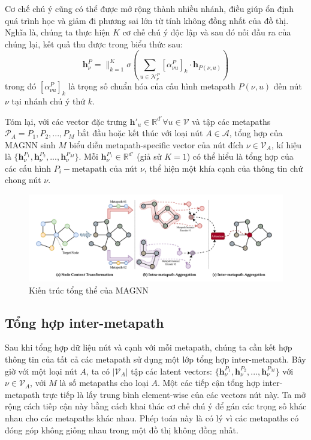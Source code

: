 Cơ chế chú ý cũng có thể được mở rộng thành nhiều nhánh, điều giúp ổn định quá trình học và giảm đi phương sai lớn từ tính không đồng nhất của đồ thị. Nghĩa là, chúng ta thực hiện $K$ cơ chế chú ý độc lập và sau đó nối đầu ra của chúng lại, kết quả thu được trong biểu thức sau:
\begin{equation}
  \mathbf{h}^P_{\nu} = \parallel ^K_{k=1} \sigma \left( \sum_{u \in \pmb{\mathcal{N}}^P_{\nu}} \left[ \alpha ^P_{\nu u} \right]_k \cdot \mathbf{h}_{P(\nu, u)} \right)
\end{equation} 
trong đó $\left[ \alpha ^P_{\nu u} \right]_k$ là trọng số chuẩn hóa của cấu hình metapath $P(\nu, u)$ đến nút $\nu$ tại nhánh chú ý thứ $k$.

Tóm lại, với các vector đặc trưng $\mathbf{h'}_{u} \in \mathbb{R}^{d'} \forall u \in \pmb{\mathcal{V}}$ và tập các metapaths $\pmb{\mathcal{P}}_A = {P_1, P_2, ..., P_M}$ bắt đầu hoặc kết thúc với loại nút $A \in \pmb{\mathcal{A}}$, tổng hợp của MAGNN sinh $M$ biểu diễn metapath-specific vector của nút đích $\nu \in \pmb{\mathcal{V}}_A$, kí hiệu là $\{ \mathbf{h}^{P_1}_{\nu}, \mathbf{h}^{P_2}_{\nu}, ... , \mathbf{h}^{P_M}_{\nu} \}$. Mỗi $\mathbf{h}^{P_1}_{\nu} \in \mathbb{R}^{d'}$ (giả sử $K=1$) có thể hiểu là tổng hợp của các cấu hình $P_i-\text{metapath}$ của nút $\nu$, thể hiện một khía cạnh của thông tin chứ chong nút $\nu$.

\begin{figure}
  \label{fig:02}
  \includegraphics[width=\textwidth]{figs/fig2.png}
  \caption{Kiến trúc tổng thể của MAGNN}
\end{figure}

\subsection{Tổng hợp inter-metapath}
Sau khi tổng hợp dữ liệu nút và cạnh với mỗi metapath, chúng ta cần kết hợp thông tin của tất cả các metapath sử dụng một lớp tổng hợp inter-metapath. Bây giờ với một loại nút $A$, ta có $|\pmb{\mathcal{V}}_A|$ tập các latent vectors: $\{ \mathbf{h}^{P_1}_{\nu}, \mathbf{h}^{P_2}_{\nu}, ... , \mathbf{h}^{P_M}_{\nu} \}$ với $\nu \in \pmb{\mathcal{V}}_A$, với $M$ là số metapaths cho loại $A$. Một các tiếp cận tổng hợp inter-metapath trực tiếp là lấy trung bình element-wise của các vectors nút này. Ta mở rộng cách tiếp cận này bằng cách khai thác cơ chế chú ý để gán các trọng số khác nhau cho các metapaths khác nhau. Phép toán này là có lý vì các metapaths có đóng góp không giống nhau trong một đồ thị không đồng nhất.

